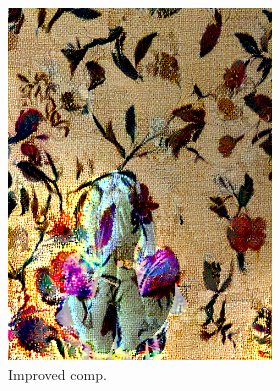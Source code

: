 \begin{figure}[]
\begin{subfigure}{\textwidth}
        \begin{subfigure}{0.24\textwidth}
            \centering
            \includegraphics[width=\textwidth]{images/04-experiment02/human/flowers2/improved_im.jpg}
            \caption*{Improved comp.}
        \end{subfigure}
        \hfill
        \begin{subfigure}{0.24\textwidth}
            \centering

\end{subfigure}
\end{subfigure}
\end{figure}

